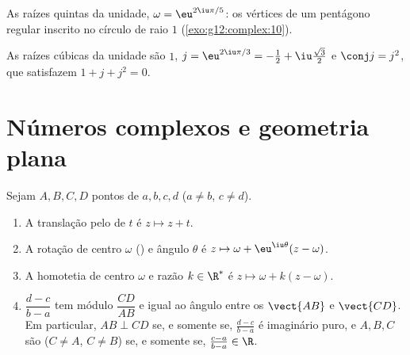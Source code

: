 \begin{omfigure}

{\small As raízes quintas da unidade, $\omega = \eu^{2\iu\pi/5}$: os
vértices de um pentágono regular inscrito no círculo de raio $1$
(\cref{exo:g12:complex:10}).}
\end{omfigure}

\begin{example}
As raízes cúbicas da unidade são $1$,
$j = \eu^{2\iu\pi/3} = -\frac12 + \iu\frac{\sqrt3}{2}$ e
$\conj j = j^2$, que satisfazem $1 + j + j^2 = 0$.
\end{example}

\section{Números complexos e geometria plana}

\begin{proposition}\label{prop:g12:complex:geometry}
Sejam $A, B, C, D$ pontos de  $a, b, c, d$ ($a \neq b$,
$c \neq d$).
\begin{enumerate}
  \item A translação pelo  de  $t$ é $z \mapsto z + t$.
  \item A rotação de centro $\omega$ () e ângulo $\theta$ é
        $z \mapsto \omega + \eu^{\iu\theta}(z - \omega)$.
  \item A homotetia de centro $\omega$ e razão $k \in \R^*$ é
        $z \mapsto \omega + k(z - \omega)$.
  \item $\dfrac{d - c}{b - a}$ tem módulo $\dfrac{CD}{AB}$ e 
        igual ao ângulo entre os  $\vect{AB}$ e $\vect{CD}$. Em
        particular, $AB \perp CD$ se, e somente se, $\frac{d-c}{b-a}$ é
        imaginário puro, e $A, B, C$ são  ($C \ne A$,
        $C\ne B$) se, e somente se, $\frac{c-a}{b-a} \in \R$.
\end{enumerate}
\end{proposition}

